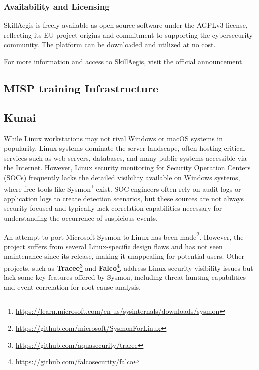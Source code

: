 \subsubsection{Availability and Licensing}
SkillAegis is freely available as open-source software under the AGPLv3 license, reflecting its EU project origins and commitment to supporting the cybersecurity community. The platform can be downloaded and utilized at no cost.

For more information and access to SkillAegis, visit the \href{https://www.misp-project.org/2024/08/14/SkillAegis-v1.0.0.html/}{official announcement}.


\subsection{MISP training Infrastructure}

\subsection{Kunai}

While Linux workstations may not rival Windows or macOS systems in popularity, Linux systems dominate the server landscape, often hosting critical services such as web servers, databases, and many public systems accessible via the Internet. However, Linux security monitoring for Security Operation Centers (SOCs) frequently lacks the detailed visibility available on Windows systems, where free tools like Sysmon\footnote{\href{https://learn.microsoft.com/en-us/sysinternals/downloads/sysmon}{https://learn.microsoft.com/en-us/sysinternals/downloads/sysmon}} exist. SOC engineers often rely on audit logs or application logs to create detection scenarios, but these sources are not always security-focused and typically lack correlation capabilities necessary for understanding the occurrence of suspicious events.

An attempt to port Microsoft Sysmon to Linux has been made\footnote{\href{https://github.com/microsoft/SysmonForLinux}{https://github.com/microsoft/SysmonForLinux}}. However, the project suffers from several Linux-specific design flaws and has not seen maintenance since its release, making it unappealing for potential users. Other projects, such as \textbf{Tracee}\footnote{\href{https://github.com/aquasecurity/tracee}{https://github.com/aquasecurity/tracee}} and \textbf{Falco}\footnote{\href{https://github.com/falcosecurity/falco}{https://github.com/falcosecurity/falco}}, address Linux security visibility issues but lack some key features offered by Sysmon, including threat-hunting capabilities and event correlation for root cause analysis.

